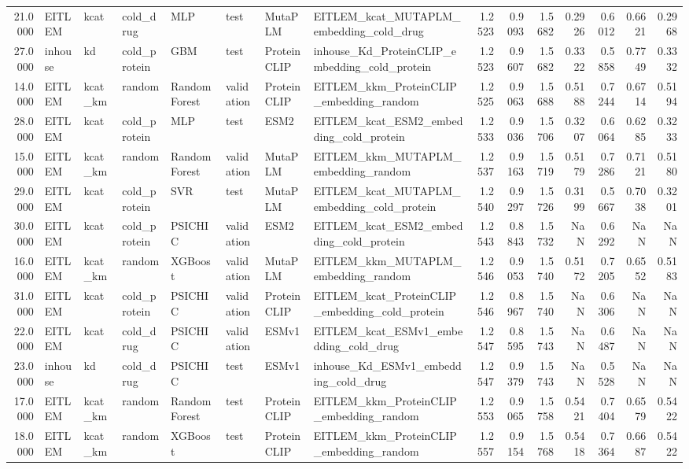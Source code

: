 \begin{tabular}{rlllllllrrrrrrr}
21.0000 & EITLEM & kcat & cold_drug & MLP & test & MutaPLM & EITLEM_kcat_MUTAPLM_embedding_cold_drug & 1.2523 & 0.9093 & 1.5682 & 0.2926 & 0.6012 & 0.6621 & 0.2968 \\
27.0000 & inhouse & kd & cold_protein & GBM & test & ProteinCLIP & inhouse_Kd_ProteinCLIP_embedding_cold_protein & 1.2523 & 0.9607 & 1.5682 & 0.3322 & 0.5858 & 0.7749 & 0.3332 \\
14.0000 & EITLEM & kcat_km & random & Random Forest & validation & ProteinCLIP & EITLEM_kkm_ProteinCLIP_embedding_random & 1.2525 & 0.9063 & 1.5688 & 0.5188 & 0.7244 & 0.6714 & 0.5194 \\
28.0000 & EITLEM & kcat & cold_protein & MLP & test & ESM2 & EITLEM_kcat_ESM2_embedding_cold_protein & 1.2533 & 0.9036 & 1.5706 & 0.3207 & 0.6064 & 0.6285 & 0.3233 \\
15.0000 & EITLEM & kcat_km & random & Random Forest & validation & MutaPLM & EITLEM_kkm_MUTAPLM_embedding_random & 1.2537 & 0.9163 & 1.5719 & 0.5179 & 0.7286 & 0.7121 & 0.5180 \\
29.0000 & EITLEM & kcat & cold_protein & SVR & test & MutaPLM & EITLEM_kcat_MUTAPLM_embedding_cold_protein & 1.2540 & 0.9297 & 1.5726 & 0.3199 & 0.5667 & 0.7038 & 0.3201 \\
30.0000 & EITLEM & kcat & cold_protein & PSICHIC & validation & ESM2 & EITLEM_kcat_ESM2_embedding_cold_protein & 1.2543 & 0.8843 & 1.5732 & NaN & 0.6292 & NaN & NaN \\
16.0000 & EITLEM & kcat_km & random & XGBoost & validation & MutaPLM & EITLEM_kkm_MUTAPLM_embedding_random & 1.2546 & 0.9053 & 1.5740 & 0.5172 & 0.7205 & 0.6552 & 0.5183 \\
31.0000 & EITLEM & kcat & cold_protein & PSICHIC & validation & ProteinCLIP & EITLEM_kcat_ProteinCLIP_embedding_cold_protein & 1.2546 & 0.8967 & 1.5740 & NaN & 0.6306 & NaN & NaN \\
22.0000 & EITLEM & kcat & cold_drug & PSICHIC & validation & ESMv1 & EITLEM_kcat_ESMv1_embedding_cold_drug & 1.2547 & 0.8595 & 1.5743 & NaN & 0.6487 & NaN & NaN \\
23.0000 & inhouse & kd & cold_drug & PSICHIC & test & ESMv1 & inhouse_Kd_ESMv1_embedding_cold_drug & 1.2547 & 0.9379 & 1.5743 & NaN & 0.5528 & NaN & NaN \\
17.0000 & EITLEM & kcat_km & random & Random Forest & test & ProteinCLIP & EITLEM_kkm_ProteinCLIP_embedding_random & 1.2553 & 0.9065 & 1.5758 & 0.5421 & 0.7404 & 0.6579 & 0.5422 \\
18.0000 & EITLEM & kcat_km & random & XGBoost & test & ProteinCLIP & EITLEM_kkm_ProteinCLIP_embedding_random & 1.2557 & 0.9154 & 1.5768 & 0.5418 & 0.7364 & 0.6687 & 0.5422 \\

\end{tabular}

